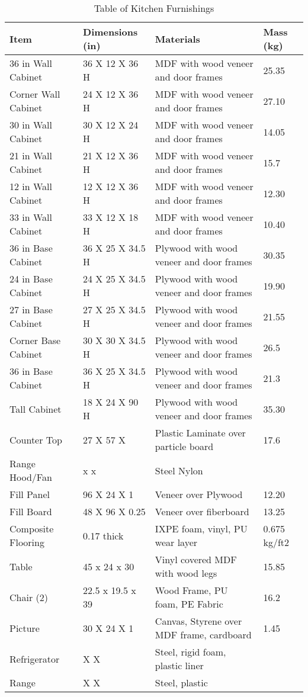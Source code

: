 \documentclass[12pt,oneside]{book}
\begin{document}
\begin{table}[!ht]
	\centering
	\caption{Table of Kitchen Furnishings}
	\label{tab:BRFuel}
	\begin{tabular}{llll}
		\toprule[1.5pt]
		Item 				& Dimensions (in) 	& Materials 										& Mass (kg)  \\
		\midrule
		36 in Wall Cabinet 	&  36 X 12 X 36 H	& MDF with wood veneer and door frames 				& 25.35 \\
		Corner Wall Cabinet &  24 X 12 X 36 H	& MDF with wood veneer and door frames   			& 27.10 \\
		30 in Wall Cabinet  &  30 X 12 X 24 H	& MDF with wood veneer and door frames 				& 14.05 \\
		21 in Wall Cabinet  &  21 X 12 X 36 H   & MDF with wood veneer and door frames              & 15.7  \\
		12 in Wall Cabinet  &  12 X 12 X 36 H 	& MDF with wood veneer and door frames 				& 12.30  \\	
		33 in Wall Cabinet 	&  33 X 12 X 18 H	& MDF with wood veneer and door frames 				& 10.40   \\
		36 in Base Cabinet	&  36 X 25 X 34.5 H	& Plywood with wood veneer and door frames			& 30.35    \\	
		24 in Base Cabinet	&  24 X 25 X 34.5 H	& Plywood with wood veneer and door frames			& 19.90    \\
		27 in Base Cabinet	&  27 X 25 X 34.5 H	& Plywood with wood veneer and door frames			& 21.55   \\
		Corner Base Cabinet	&  30 X 30 X 34.5 H	& Plywood with wood veneer and door frames			& 26.5    \\
		36 in Base Cabinet	&  36 X 25 X 34.5 H	& Plywood with wood veneer and door frames			& 21.3    \\
		Tall Cabinet		&  18 X 24 X 90 H	& Plywood with wood veneer and door frames			& 35.30    \\
		Counter Top			&  27 X 57 X 		& Plastic Laminate over particle board          	& 17.6    \\
		Range Hood/Fan		&   x  x 			& Steel Nylon										&      \\
		Fill Panel			&  96 X 24 X 1		& Veneer over Plywood 								& 12.20  \\
		Fill Board		 	&  48 X 96 X 0.25  	& Veneer over fiberboard    						& 13.25   \\
		Composite Flooring	&   0.17 thick 		& IXPE foam, vinyl, PU wear layer					&	0.675 kg/ft2  \\
		Table				& 45 x 24 x 30		& Vinyl covered MDF with wood legs					& 	15.85 \\
		Chair (2)			& 22.5 x 19.5 x 39  & Wood Frame, PU foam, PE Fabric 					&  16.2  \\
		Picture 			& 30 X 24 X 1		& Canvas, Styrene over MDF frame, cardboard 		&  1.45  \\
		Refrigerator		&  X  X             & Steel, rigid foam, plastic liner					&        \\
		Range 				&  X   X 			& Steel, plastic 									&        \\
		\bottomrule[1.25pt]
	\end{tabular}
\end{table}
\end{document}
